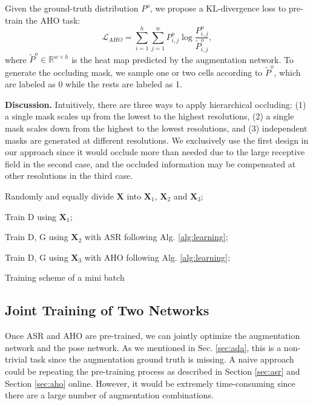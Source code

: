 \documentclass[10pt,twocolumn,letterpaper]{article}
\begin{document}
Given the ground-truth distribution $P^o$, we propose a KL-divergence loss to pre-train the AHO task:
\begin{equation} \label{eq:loss-AHO}
\mathcal{L}_{AHO}=\sum_{i=1}^h\sum_{j=1}^wP_{i,j}^o \log\frac{P_{i,j}^o}{\tilde{P}_{i,j}^o},
\end{equation}
where $\tilde{P}^o \in \mathbb{R}^{w \times h}$ is the heat map predicted by the augmentation network. To generate the occluding mask, we sample one or two cells according to $\tilde{P}^o$, which are labeled as 0 while the rests are labeled as 1. 

{\bf Discussion.} Intuitively, there are three ways to apply hierarchical occluding: (1) a single mask scales up from the lowest to the highest resolutions, (2) a single mask scales down from the highest to the lowest resolutions, and (3) independent masks are generated at different resolutions. We exclusively use the first design in our approach since it would occlude more than needed due to the large receptive field in the second case, and the occluded information may be compensated at other resolutions in the third case.

\begin{algorithm}[t!]
\SetAlgoLined
{}
Randomly and equally divide $\mathbf{X}$ into $\mathbf{X}_1$, $\mathbf{X}_2$ and $\mathbf{X}_3$;

Train D using $\mathbf{X}_1$;

Train D, G using $\mathbf{X}_2$ with ASR following Alg. \ref{alg:learning};

Train D, G using $\mathbf{X}_3$ with AHO following Alg. \ref{alg:learning};
\caption{Training scheme of a mini batch} \label{alg:jointtrain}
\end{algorithm}\subsection{Joint Training of Two Networks}\label{sec:joint}

Once ASR and AHO are pre-trained, we can jointly optimize the augmentation network and the pose network. As we mentioned in Sec. \ref{sec:ada}, this is a non-trivial task since the augmentation ground truth is missing. A naive approach could be repeating the pre-training process as described in Section \ref{sec:asr} and Section \ref{sec:aho} online. However, it would be extremely time-consuming since there are a large number of augmentation combinations.
\end{document}
